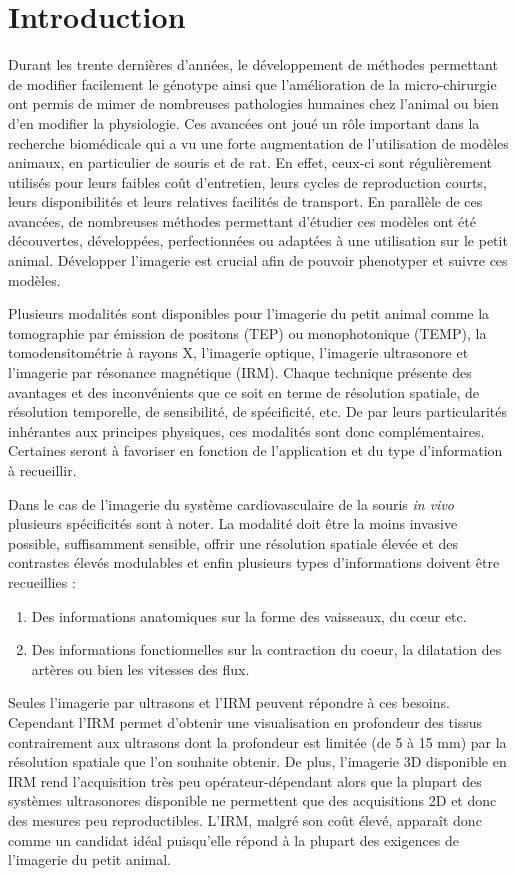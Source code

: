 \chapter{Introduction}
\setlength{\footskip}{50pt}
\label{Chap1}

Durant les trente dernières d'années, le développement de méthodes permettant de modifier facilement le génotype ainsi que l'amélioration de la micro-chirurgie ont permis de mimer de nombreuses pathologies humaines chez l'animal ou bien d'en modifier la physiologie. Ces avancées ont joué un rôle important dans la recherche biomédicale qui a vu une forte augmentation de l'utilisation de modèles animaux, en particulier de souris et de rat. En effet, ceux-ci sont régulièrement utilisés pour leurs faibles coût d'entretien, leurs cycles de reproduction courts, leurs disponibilités et leurs relatives facilités de transport. En parallèle de ces avancées, de nombreuses méthodes permettant d'étudier ces modèles ont été découvertes, développées, perfectionnées ou adaptées à une utilisation sur le petit animal. Développer l'imagerie est crucial afin de pouvoir phenotyper et suivre ces modèles. 
\medbreak

Plusieurs modalités sont disponibles pour l'imagerie du petit animal comme la tomographie par émission de positons (TEP) ou monophotonique (TEMP), la tomodensitométrie à rayons X, l'imagerie optique, l'imagerie ultrasonore et l'imagerie par résonance magnétique (IRM). Chaque technique présente des avantages et des inconvénients que ce soit en terme de résolution spatiale, de résolution temporelle, de sensibilité, de spécificité, etc. De par leurs particularités inhérantes aux principes physiques, ces modalités sont donc complémentaires. Certaines seront à favoriser en fonction de l'application et du type d'information à recueillir.
\medbreak

Dans le cas de l'imagerie du système cardiovasculaire de la souris \textit{in vivo} plusieurs spécificités sont à noter. La modalité doit être la moins invasive possible, suffisamment sensible, offrir une résolution spatiale élevée et des contrastes élevés modulables et enfin plusieurs types d'informations doivent être recueillies :
\begin{enumerate}
 \item Des informations anatomiques sur la forme des vaisseaux, du cœur etc.
 \item Des informations fonctionnelles sur la contraction du coeur, la dilatation des artères ou bien les vitesses des flux.
\end{enumerate}
Seules l'imagerie par ultrasons et l'IRM peuvent répondre à ces besoins. Cependant l'IRM permet d'obtenir une visualisation en profondeur des tissus contrairement aux ultrasons dont la profondeur est limitée (de 5 à 15 mm) par la résolution spatiale que l'on souhaite obtenir. De plus, l'imagerie 3D disponible en IRM rend l'acquisition très peu opérateur-dépendant alors que la plupart des systèmes ultrasonores disponible ne permettent que des acquisitions 2D et donc des mesures peu reproductibles. L'IRM, malgré son coût élevé, apparaît donc comme un candidat idéal puisqu'elle répond à la plupart des exigences de l'imagerie du petit animal.

